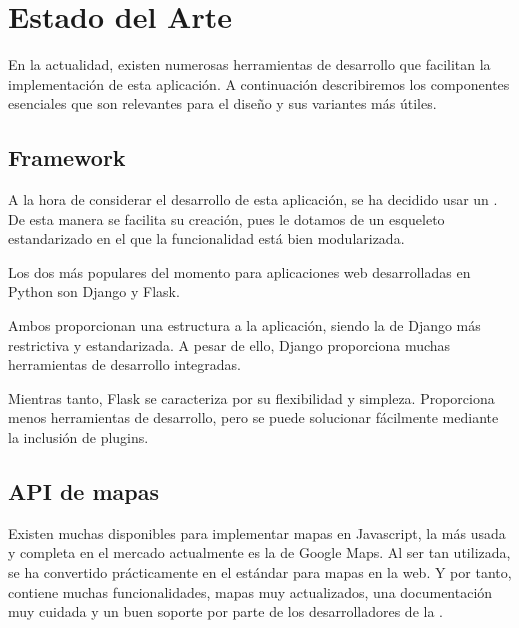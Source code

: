   
\chapter{Estado del Arte\label{CAP:ESTADOARTE}}
  En la actualidad, existen numerosas herramientas de desarrollo que facilitan la implementación de esta aplicación. A continuación describiremos los componentes esenciales que son relevantes para el diseño y sus variantes más útiles.


  \section{Framework}
    A la hora de considerar el desarrollo de esta aplicación, se ha decidido usar un . De esta manera se facilita su creación, pues le dotamos de un esqueleto estandarizado en el que la funcionalidad está bien modularizada.
    
    Los dos  más populares del momento para aplicaciones web desarrolladas en Python son Django\cite{django} y Flask\cite{flask}.

    Ambos proporcionan una estructura a la aplicación, siendo la de Django más restrictiva y estandarizada. A pesar de ello, Django proporciona muchas herramientas de desarrollo integradas.
    
    Mientras tanto, Flask se caracteriza por su flexibilidad y simpleza. Proporciona menos herramientas de desarrollo, pero se puede solucionar fácilmente mediante la inclusión de plugins.
    
  
  \section{API de mapas}
  
    Existen muchas  disponibles para implementar mapas en Javascript, la más usada y completa en el mercado actualmente es la de Google Maps\cite{gmaps}. Al ser tan utilizada, se ha convertido prácticamente en el estándar para mapas en la web. Y por tanto, contiene muchas funcionalidades, mapas muy actualizados, una documentación muy cuidada y un buen soporte por parte de los desarrolladores de la .
    
